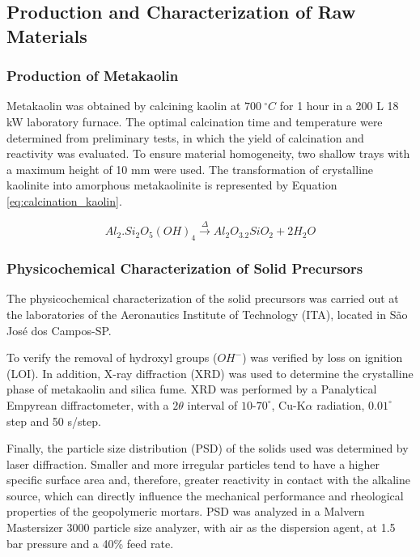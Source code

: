 \subsection{Production and Characterization of Raw Materials}
\label{sec:production_characterization_raw_materials}

\subsubsection{Production of Metakaolin}
\label{sec:production_of_metakaolin}

Metakaolin was obtained by calcining kaolin at $700\ ^\circ C$ for 1 hour in a 200 L 18 kW laboratory furnace.
The optimal calcination time and temperature were determined from preliminary tests, in which the yield of calcination and reactivity was evaluated.
To ensure material homogeneity, two shallow trays with a maximum height of 10 mm were used.
The transformation of crystalline kaolinite into amorphous metakaolinite is represented by Equation \ref{eq:calcination_kaolin}.

\begin{equation}
    \label{eq:calcination_kaolin}
        Al_2.Si_2O_5\left(OH\right)_4 \xrightarrow{\Delta} Al_2O_3.2SiO_2 + 2 H_2O
\end{equation}

\subsubsection{Physicochemical Characterization of Solid Precursors}
\label{sec:physicochemical_characterization_precursors}

The physicochemical characterization of the solid precursors was carried out at the laboratories of the Aeronautics Institute of Technology (ITA), located in São José dos Campos-SP.

To  verify the removal of hydroxyl groups ($OH^-$) was verified by loss on ignition (LOI).
In addition, X-ray diffraction (XRD) was used to determine the crystalline phase of metakaolin and silica fume.
XRD was performed by a Panalytical Empyrean diffractometer, with a $2\theta$ interval of $10$-$70^\circ$, Cu-$\mathrm{K}\alpha$ radiation, $0.01^\circ$ step and 50 s/step.


Finally, the particle size distribution (PSD) of the solids used was determined by laser diffraction. Smaller and more irregular particles tend to have a higher specific surface area and, therefore, greater reactivity in contact with the alkaline source, which can directly influence the mechanical performance and rheological properties of the geopolymeric mortars.
PSD was analyzed in a Malvern Mastersizer 3000 particle size analyzer, with air as the dispersion agent, at 1.5 bar pressure and a 40\% feed rate.

